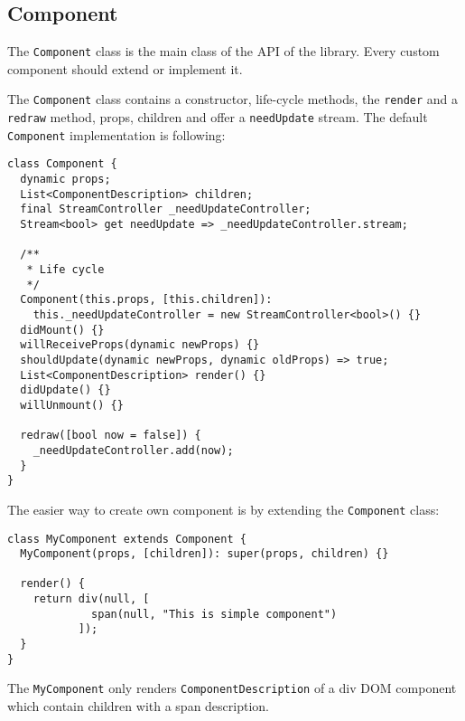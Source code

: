 \documentclass[oneside, 12pt]{book}
\begin{document}


  \subsection{Component}\label{subsec:our-api-component}

    The \texttt{Component} class is the main class of the API of the \tiles library.
    Every custom component should extend or implement it. 

		The \texttt{Component} class contains a constructor, life-cycle methods, 
		the \texttt{render} and a \texttt{redraw} method, props, children and offer a \texttt{needUpdate} stream.
    The default \texttt{Component} implementation is following: 
\begin{verbatim}
class Component {
  dynamic props;
  List<ComponentDescription> children;
  final StreamController _needUpdateController;
  Stream<bool> get needUpdate => _needUpdateController.stream; 

  /**
   * Life cycle
   */
  Component(this.props, [this.children]): 
    this._needUpdateController = new StreamController<bool>() {}
  didMount() {}
  willReceiveProps(dynamic newProps) {}
  shouldUpdate(dynamic newProps, dynamic oldProps) => true;
  List<ComponentDescription> render() {}
  didUpdate() {}
  willUnmount() {}
  
  redraw([bool now = false]) {
    _needUpdateController.add(now);
  }
}
\end{verbatim}



		The easier way to create own component is by extending the \texttt{Component} class:
\begin{verbatim}
class MyComponent extends Component {
  MyComponent(props, [children]): super(props, children) {}

  render() {
    return div(null, [
             span(null, "This is simple component")
           ]);
  }
}
\end{verbatim}



    The \texttt{MyComponent} only renders \texttt{ComponentDescription} of a div DOM component which contain children with a span description.
\end{document}

